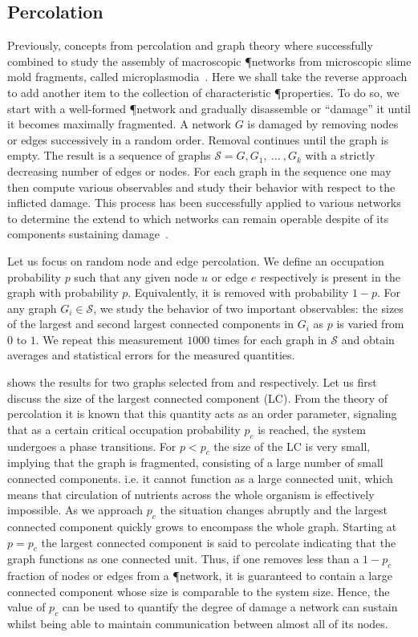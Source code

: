 	\subsection{Percolation}

		Previously, concepts from percolation and graph theory where successfully combined to study the assembly of macroscopic \P networks from microscopic slime mold fragments, called microplasmodia~\cite{fessel2012physarum,fessel2014analytical,fessel2015structuring}. Here we shall take the reverse approach to add another item to the collection of characteristic \P properties. To do so, we start with a well-formed \P network and gradually disassemble or ``damage'' it until it becomes maximally fragmented. A network $G$ is damaged by removing nodes or edges successively in a random order. Removal continues until the graph is empty. The result is a sequence of graphs $\mathcal{S} = {G,G_1, \ \dots \ , G_k}$ with a strictly decreasing number of edges or nodes. For each graph in the sequence one may then compute various observables and study their behavior with respect to the inflicted damage. This process has been successfully applied to various networks to determine the extend to which networks can remain operable despite of its components sustaining damage~\cite{callaway2000network,carlson2002complexity}. 

		Let us focus on random node and edge percolation. We define an occupation probability $p$ such that any given node $u$ or edge $e$ respectively is present in the graph with probability $p$. Equivalently, it is removed with probability $1-p$. For any graph $G_i \in \mathcal{S} $, we study the behavior of two important observables: the sizes of the largest and second largest connected components in $G_i$ as $p$ is varied from $0$ to $1$. We repeat this measurement $1000$ times for each graph in $\mathcal{S}$ and obtain averages and statistical errors for the measured quantities. 

		 shows the results for two graphs selected from  and  respectively. Let us first discuss the size of the largest connected component (LC). From the theory of percolation it is known that this quantity acts as an order parameter, signaling that as a certain critical occupation probability $p_c$ is reached, the system undergoes a phase transitions. For $p < p_c$ the size of the LC is very small, implying that the graph is fragmented, consisting of a large number of small connected components. i.e. it cannot function as a large connected unit, which means that circulation of nutrients across the whole organism is effectively impossible. As we approach $p_c$ the situation changes abruptly and the largest connected component quickly grows to encompass the whole graph. Starting at $p=p_c$ the largest connected component is said to percolate indicating that the graph functions as one connected unit. Thus, if one removes less than a $1-p_c$ fraction of nodes or edges from a \P network, it is guaranteed to contain a large connected component whose size is comparable to the system size. Hence, the value of $p_c$ can be used to quantify the degree of damage a network can sustain whilst being able to maintain communication between almost all of its nodes.

